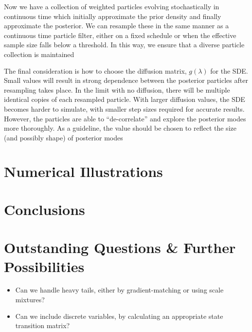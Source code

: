 \documentclass{article}
\begin{document}
Now we have a collection of weighted particles evolving stochastically in continuous time which initially approximate the prior density and finally approximate the posterior. We can resample these in the same manner as a continuous time particle filter, either on a fixed schedule or when the effective sample size falls below a threshold. In this way, we ensure that a diverse particle collection is maintained

The final consideration is how to choose the diffusion matrix, $g(\lambda)$ for the SDE. Small values will result in strong dependence between the posterior particles after resampling takes place. In the limit with no diffusion, there will be multiple identical copies of each resampled particle. With larger diffusion values, the SDE becomes harder to simulate, with smaller step sizes required for accurate results. However, the particles are able to ``de-correlate'' and explore the posterior modes more thoroughly. As a guideline, the value should be chosen to reflect the size (and possibly shape) of posterior modes


\section{Numerical Illustrations}



\section{Conclusions}



\section{Outstanding Questions \& Further Possibilities}

\begin{itemize}
  \item Can we handle heavy tails, either by gradient-matching or using scale mixtures?
  \item Can we include discrete variables, by calculating an appropriate state transition matrix?
\end{itemize}
\end{document}
